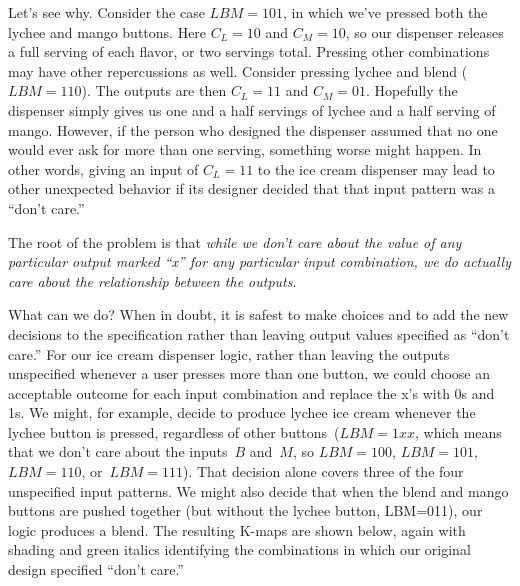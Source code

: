 Let's see why.
%
Consider the case $LBM=101$, in which we've pressed both the lychee and
mango buttons.  Here $C_L=10$ and $C_M=10$, so our dispenser releases a 
full serving of each flavor, or two servings total.  Pressing other 
combinations may have other repercussions as well.
Consider pressing lychee and blend ($LBM=110$).  The outputs are then
$C_L=11$ and $C_M=01$.  Hopefully the dispenser simply gives us one
and a half servings of lychee and a half serving of mango.  However,
if the person who designed the dispenser assumed that no one would ever
ask for more than one serving, something worse might happen.  In other
words, giving an input of $C_L=11$ to the ice cream dispenser may lead to
other unexpected behavior if its designer decided that that input 
pattern was a ``don't care.''

The root of the problem is that {\em while we don't care about the value of
any particular output marked ``x'' for any particular input combination,
we do actually care about the relationship between the outputs}.  

What can we do?  When in doubt, it is safest to make 
choices and to add the new decisions to the specification rather than 
leaving output values specified as ``don't care.''
%
For our ice cream dispenser logic, rather than leaving the outputs 
unspecified whenever a user presses more than one button, we could 
choose an acceptable outcome for each input combination and 
replace the x's with 0s and 1s.  We might, for example, decide to
produce lychee ice cream whenever the lychee button is pressed, regardless
of other buttons~($LBM=1xx$, which means that we don't care about the
inputs~$B$ and~$M$, so $LBM=100$, $LBM=101$, $LBM=110$, or~$LBM=111$).  
That decision alone covers three of the
four unspecified input patterns.  We might also decide that when the 
blend and mango buttons are pushed together (but without the lychee
button, LBM=011), our logic produces a blend.  
%
The resulting K-maps are shown below, again with shading and green italics 
identifying
the combinations in which our original design specified ``don't care.''\\

\centerline{\hspace{.25in}\hspace{.25in}\hspace{.25in}}\vspace{6pt}


